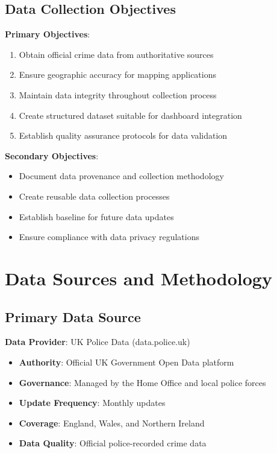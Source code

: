 \documentclass[12pt,a4paper]{article}
\begin{document}
\subsection{Data Collection Objectives}

\textbf{Primary Objectives}:
\begin{enumerate}
    \item Obtain official crime data from authoritative sources
    \item Ensure geographic accuracy for mapping applications
    \item Maintain data integrity throughout collection process
    \item Create structured dataset suitable for dashboard integration
    \item Establish quality assurance protocols for data validation
\end{enumerate}

\textbf{Secondary Objectives}:
\begin{itemize}
    \item Document data provenance and collection methodology
    \item Create reusable data collection processes
    \item Establish baseline for future data updates
    \item Ensure compliance with data privacy regulations
\end{itemize}

\section{Data Sources and Methodology}

\subsection{Primary Data Source}

\textbf{Data Provider}: UK Police Data (data.police.uk)
\begin{itemize}
    \item \textbf{Authority}: Official UK Government Open Data platform
    \item \textbf{Governance}: Managed by the Home Office and local police forces
    \item \textbf{Update Frequency}: Monthly updates
    \item \textbf{Coverage}: England, Wales, and Northern Ireland
    \item \textbf{Data Quality}: Official police-recorded crime data
\end{itemize}
\end{document}
